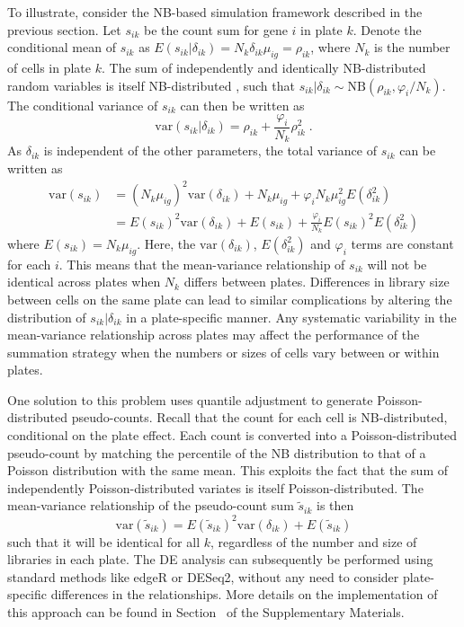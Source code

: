 \documentclass[oupdraft]{bio}
\begin{document}
To illustrate, consider the NB-based simulation framework described in the previous section.
Let $s_{ik}$ be the count sum for gene $i$ in plate $k$.
Denote the conditional mean of $s_{ik}$ as $E(s_{ik}|\delta_{ik})=N_k \delta_{ik}\mu_{ig} = \rho_{ik}$, where $N_k$ is the number of cells in plate $k$.
The sum of independently and identically NB-distributed random variables is itself NB-distributed \citep{robinson2008small}, 
    such that $s_{ik} |\delta_{ik} \sim \mbox{NB}(\rho_{ik}, \varphi_{i}/N_k)$.
The conditional variance of $s_{ik}$ can then be written as
\[
    \mbox{var}(s_{ik} |\delta_{ik}) = \rho_{ik} + \frac{\varphi_{i}}{N_k}\rho_{ik}^2 \;.
\]
As $\delta_{ik}$ is independent of the other parameters, the total variance of $s_{ik}$ can be written as
\begin{align*}
    \mbox{var}(s_{ik}) &= (N_k\mu_{ig})^2\mbox{var}(\delta_{ik}) + N_k\mu_{ig} + \varphi_{i} N_k\mu_{ig}^2 E(\delta_{ik}^2) \nonumber \\ 
                       &= E(s_{ik})^2 \mbox{var}(\delta_{ik}) + E(s_{ik}) + \frac{\varphi_{i}}{N_k} E(s_{ik})^2 E(\delta_{ik}^2) 
\end{align*}
where $E(s_{ik})=N_k\mu_{ig}$. 
Here, the $\mbox{var}(\delta_{ik})$, $E(\delta_{ik}^2)$ and $\varphi_{i}$ terms are constant for each $i$.
This means that the mean-variance relationship of $s_{ik}$ will not be identical across plates when $N_k$ differs between plates.
Differences in library size between cells on the same plate can lead to similar complications by altering the distribution of $s_{ik} |\delta_{ik}$ in a plate-specific manner.
Any systematic variability in the mean-variance relationship across plates may affect the performance of the summation strategy when the numbers or sizes of cells vary between or within plates.

One solution to this problem uses quantile adjustment \citep{robinson2008small} to generate Poisson-distributed pseudo-counts.
Recall that the count for each cell is NB-distributed, conditional on the plate effect.
Each count is converted into a Poisson-distributed pseudo-count by matching the percentile of the NB distribution to that of a Poisson distribution with the same mean.
This exploits the fact that the sum of independently Poisson-distributed variates is itself Poisson-distributed.
The mean-variance relationship of the pseudo-count sum $\tilde{s}_{ik}$ is then
\[
    \mbox{var}(\tilde{s}_{ik}) = E(\tilde{s}_{ik})^2 \mbox{var}(\delta_{ik}) + E(\tilde{s}_{ik}) 
\]
such that it will be identical for all $k$, regardless of the number and size of libraries in each plate.
The DE analysis can subsequently be performed using standard methods like edgeR or DESeq2, without any need to consider plate-specific differences in the relationships.
More details on the implementation of this approach can be found in Section~\suppquantile{} of the Supplementary Materials.
\end{document}
